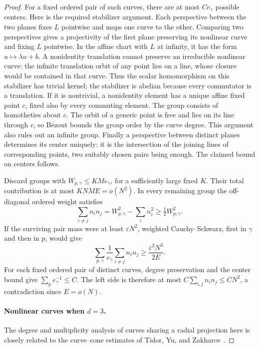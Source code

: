\begin{proof}
For a fixed ordered pair of such curves, there are at most
$C e_\gamma$ possible centers. Here is the required stabilizer argument.
Each perspective between the two planes fixes $L$ pointwise and maps
one curve to the other. Comparing two perspectives gives a projectivity
of the first plane preserving its nonlinear curve and fixing $L$
pointwise. In the affine chart with $L$ at infinity, it has the form
$u\mapsto\lambda u+b$. A nonidentity translation cannot preserve an
irreducible nonlinear curve: the infinite translation orbit of any
point lies on a line, whose closure would be contained in that curve.
Thus the scalar homomorphism on this stabilizer has trivial kernel;
the stabilizer is abelian because every commutator is a translation.
If it is nontrivial, a nonidentity element has a unique affine fixed
point $c$, fixed also by every commuting element. The group consists
of homotheties about $c$. The orbit of a generic point is free and
lies on its line through $c$, so B\'ezout bounds the group order by
the curve degree. This argument also rules out an infinite group.
Finally a perspective between distinct planes determines its center
uniquely: it is the intersection of the joining lines of corresponding
points, two suitably chosen pairs being enough. The claimed bound
on centers follows.

Discard groups with $W_{p,\gamma}\le KMe_\gamma$, for a sufficiently
large fixed $K$. Their total contribution is at most $KNME=o(N^2)$.
In every remaining group the off-diagonal ordered weight satisfies
\[
 \sum_{i\ne j}n_i n_j
   =W_{p,\gamma}^2-\sum_i n_i^2
   \ge\tfrac12 W_{p,\gamma}^2.
\]
If the surviving pair mass were at least $\varepsilon N^2$, weighted
Cauchy--Schwarz, first in $\gamma$ and then in $p$, would give
\[
 \sum_{p,\gamma}\frac{1}{e_\gamma}\sum_{i\ne j}n_i n_j
 \ge \frac{\varepsilon^2N^3}{2E}.
\]
For each fixed ordered pair of distinct curves, degree preservation
and the center bound give
$\sum_p e_\gamma^{-1}\le C$. The left side is therefore at most
$C\sum_{i,j}n_i n_j\le CN^2$, a contradiction since $E=o(N)$.

\paragraph{Nonlinear curves when $d=3$.}
The degree and multiplicity analysis of curves sharing a radial
projection here is closely related to the curve--cone estimates of
Tidor, Yu, and Zakharov
\cite[Sections~10.2--10.3]{tidoryuzakharov2026}.


\end{proof}
